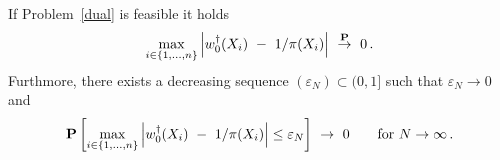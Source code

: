 \begin{theorem}
  \label{th:max_weight_cons}
  If Problem~\ref{dual} is feasible it holds
  \begin{align*}
    \max_{i\in \left\{ 1,\ldots,n \right\}}
    \left| 
  w_0^\dagger(X_i)
  \ 
  -
  \ 
  1/\pi(X_i)
    \right|
  \ 
  \overset{\P}{\to}
  \ 
  0
  \,.
  \end{align*}
  Furthmore, there exists a decreasing sequence $(\varepsilon_N)\subset(0,1]$ such that $\varepsilon_N\to 0$ and 
  \begin{gather*}
    \P
    \left[ 
    \max_{i\in \left\{ 1,\ldots,n \right\}}
    \left| 
  w_0^\dagger(X_i)
  \ 
  -
  \ 
  1/\pi(X_i)
    \right|
    \le
    \varepsilon_N
    \right]
  \  
  \to
  \  
  0
  \qquad
  \text{for}
  \ 
  N\to\infty
  \,.
  \end{gather*}
\end{theorem}

